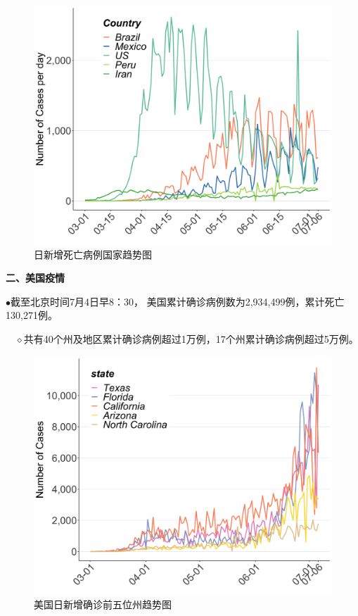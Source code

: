\documentclass[
]{article}
\begin{document}
\begin{figure}[H]
\centering
{}
\caption{日新增死亡病例国家趋势图}
\includegraphics[]{./input/covid3.png}
\end{figure}

\vspace{-7mm}

\begin{huge}{\textcolor{glaucous}{\textbf {二、美国疫情}}}\end{huge}

\(\bullet\)截至北京时间7月4日早8：30，
美国累计确诊病例数为2,934,499例，累计死亡130,271例。

\(\quad\)\(\diamond\)共有40个州及地区累计确诊病例超过1万例，17个州累计确诊病例超过5万例。

\begin{figure}[H]
\centering
{}
\caption{美国日新增确诊前五位州趋势图}
\includegraphics[]{./input/covid5.png}
\end{figure}
\end{document}
